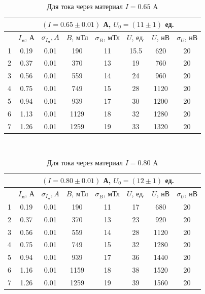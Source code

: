 \documentclass[a4paper,12pt]{article}
\theoremstyle{definition}
\begin{document}
    \begin{table}[H]
      \centering
      \caption{Для тока через материал $I = 0.65$ A}
      \label{tabular:med4}
        \begin{tabular}{|c|c|c|c|c|c|c|c|} \hline
            & \multicolumn{7}{c|}{$(I = 0.65 \pm 0.01)$ А, \qquad $U_0 = (11 \pm 1)$ ед.} \\ \hline
            & $I_{\text{м}}$, А & $\sigma_{I_{\text{м}}}, A$ & $B$, мТл & $\sigma_B$, мТл & $U$, ед. & $U$, нВ & $\sigma_{U}$, нВ \\ \hline
          1 & 0.19 & 0.01 &  190 & 11 & 15.5 & 620 & 20 \\ \hline
          2 & 0.37 & 0.01 &  370 & 13 & 19 & 760 & 20 \\ \hline
          3 & 0.56 & 0.01 &  559 & 14 & 24 & 960 & 20 \\ \hline
          4 & 0.75 & 0.01 &  749 & 15 & 28 & 1120 & 20 \\ \hline
          5 & 0.94 & 0.01 &  939 & 17 & 30 & 1200 & 20 \\ \hline
          6 & 1.13 & 0.01 & 1129 & 18 & 32 & 1280 & 20 \\ \hline
          7 & 1.26 & 0.01 & 1259 & 19 & 33 & 1320 & 20 \\ \hline
        \end{tabular}\\
    \end{table}

    \begin{table}[H]
      \centering
      \caption{Для тока через материал $I = 0.80$ A}
      \label{tabular:med5}
        \begin{tabular}{|c|c|c|c|c|c|c|c|} \hline
            & \multicolumn{7}{c|}{$(I = 0.80 \pm 0.01)$ А, \qquad $U_0 = (12 \pm 1)$ ед.} \\ \hline
            & $I_{\text{м}}$, А & $\sigma_{I_{\text{м}}}, A$ & $B$, мТл & $\sigma_B$, мТл & $U$, ед. & $U$, нВ & $\sigma_{U}$, нВ \\ \hline
          1 & 0.19 & 0.01 &  190 & 11 & 17 & 680 & 20 \\ \hline
          2 & 0.37 & 0.01 &  370 & 13 & 23 & 920 & 20 \\ \hline
          3 & 0.56 & 0.01 &  559 & 14 & 28 & 1120 & 20 \\ \hline
          4 & 0.75 & 0.01 &  749 & 15 & 32 & 1280 & 20 \\ \hline
          5 & 0.94 & 0.01 &  939 & 17 & 36 & 1440 & 20 \\ \hline
          6 & 1.16 & 0.01 & 1159 & 18 & 38 & 1520 & 20 \\ \hline
          7 & 1.26 & 0.01 & 1259 & 19 & 39 & 1560 & 20 \\ \hline
        \end{tabular}\\
    \end{table}
\end{document}
